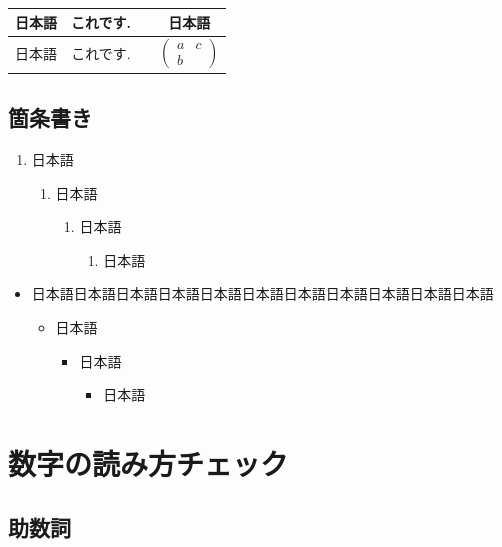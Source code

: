 \documentclass[lualatex,ja=standard,jafont=haranoaji]{bxjsarticle}
\newcommand\?{\BrailleReading}
\numberwithin{subsection}{section}
\numberwithin{equation}{subsection}
\begin{document}

\begin{tabular}{c|c|c|c}
  \hline
  日本語 & これです. & & 日本語 \\
  \hline
  \hline
  日本語 & これです. & & $
                         \begin{pmatrix}
                           a & c\\b
                         \end{pmatrix}$
  \\
  \hline
\end{tabular}


\subsection{箇条書き}
\begin{enumerate}
\item 日本語
\begin{enumerate}
\item 日本語
\begin{enumerate}
\item 日本語
\begin{enumerate}
\item 日本語
\end{enumerate}
\end{enumerate}
\end{enumerate}
\end{enumerate}
\begin{itemize}
\item 日本語日本語日本語日本語日本語日本語日本語日本語日本語日本語日本語
\begin{itemize}
\item 日本語
\begin{itemize}
\item 日本語
\begin{itemize}
\item 日本語
\end{itemize}
\end{itemize}
\end{itemize}
\end{itemize}


\section{数字の読み方チェック}
\subsection{助数詞}
\end{document}
